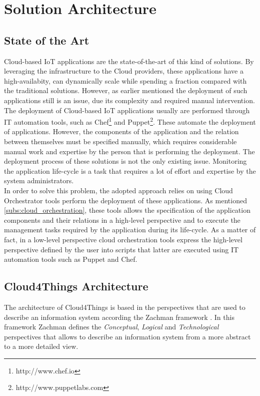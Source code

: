 \section{Solution Architecture}
\label{sec:solution_architecture}
\subsection{State of the Art}
\label{sub:state_of_art}
Cloud-based IoT applications are the state-of-the-art of this kind of solutions. By leveraging
the infrastructure to the Cloud providers, these applications have a high-availabity, can dynamically
scale while spending a fraction compared with the traditional solutions. However, as earlier
mentioned the deployment of such applications still is an issue, due its complexity and
required manual intervention. The deployment of Cloud-based IoT applications usually are performed
through IT automation tools, such as Chef\footnote{http://www.chef.io} and Puppet\footnote{http://www.puppetlabs.com}.
These automate the deployment of applications. However, the components of the application and the relation between
themselves must be specified manually, which requires considerable manual work and expertise by the person that
is performing the deployment. The deployment process of these solutions is not the only existing issue.
Monitoring the application life-cycle is a task that requires a lot of effort and expertise by the system
administrators.\\

In order to solve this problem, the adopted approach relies on using Cloud Orchestrator tools perform the
deployment of these applications. As mentioned \ref{subs:cloud_orchestration},
these tools allows the specification of the application components and their relations in a high-level perspective
and to execute the management tasks required by the application during its life-cycle. As a matter of fact,
in a low-level perspective cloud orchestration tools express the high-level perspective defined by the user
into scripts that latter are executed using IT automation tools such as Puppet and Chef.
\subsection{Cloud4Things Architecture}
\label{sub:cloud4things_architecture}
The architecture of Cloud4Things is based in the perspectives that are
used to describe an information system according the Zachman framework \cite{zachman1987framework}.
In this framework Zachman defines the \textit{Conceptual}, \textit{Logical} and
\textit{Technological} perspectives that allows to describe an information system
from a more abstract to a more detailed view.
